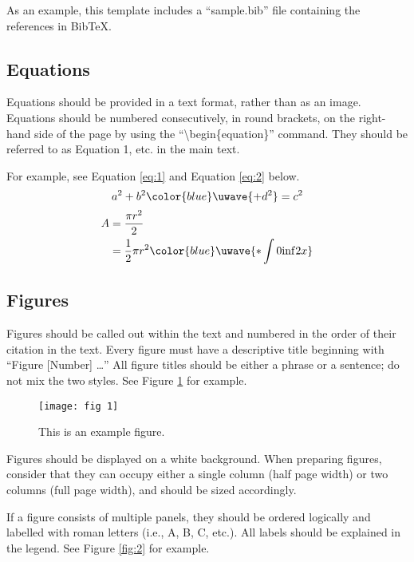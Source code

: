 \documentclass{article}
\providecommand{\DIFadd}[1]{{\protect\color{blue}\uwave{#1}}} %
\providecommand{\DIFaddbegin}{} %
\providecommand{\DIFaddend}{} %
\newcommand{\DIFaddincludegraphics}[2][]{{\color{blue}\fbox{\DIFOincludegraphics[#1]{#2}}}} %
\DeclareRobustCommand{\DIFaddbegin}{\DIFOaddbegin \let\includegraphics\DIFaddincludegraphics} %
\DeclareRobustCommand{\DIFaddend}{\DIFOaddend \let\includegraphics\DIFOincludegraphics} %
\begin{document}
As an example, this template includes a ``sample.bib'' file containing the references in BibTeX.

\subsection*{Equations}
Equations should be provided in a text format, rather than as an image. Equations should be numbered consecutively, in round brackets, on the right-hand side of the page by using the ``\textbackslash begin\{equation\}'' command. They should be referred to as Equation 1, etc. in the main text.

\medskip For example, see Equation \ref{eq:1} and Equation \ref{eq:2} below.
\begin{equation} \label{eq:1}
    a^2 + b^2 \DIFaddbegin \DIFadd{+ d^2 }\DIFaddend = c^2
\end{equation}
\begin{equation} \label{eq:2}
\begin{split}
A & = \frac{\pi r^2}{2} \\
 & = \frac{1}{2} \pi r^2 \DIFaddbegin \DIFadd{*\int{0}{\inf}{2x}
}\DIFaddend \end{split}
\end{equation}

\subsection*{Figures}
Figures should be called out within the text and numbered in the order of their citation in the text. Every figure must have a descriptive title beginning with ``Figure [Number] …'' All figure titles should be either a phrase or a sentence; do not mix the two styles. See Figure \ref{fig:1} for example.
\begin{figure}[h]
    \centering
    \texttt{[image: fig 1]}
    \caption{This is an example figure.}
    \label{fig:1}
\end{figure}

Figures should be displayed on a white background. When preparing figures, consider that they can occupy either a single column (half page width) or two columns (full page width), and should be sized accordingly.

If a figure consists of multiple panels, they should be ordered logically and labelled with roman letters (i.e., A, B, C, etc.). All labels should be explained in the legend. See Figure \ref{fig:2} for example.
\end{document}

